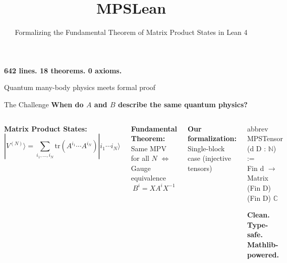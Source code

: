 \documentclass[aspectratio=169,10pt]{beamer}
\title{\textbf{MPSLean}}
\subtitle{Formalizing the Fundamental Theorem of Matrix Product States in Lean 4}
\date{}
\author{}
\begin{document}
\begin{frame}
\titlepage
\vspace{-2em}
\begin{center}
\huge\textcolor{leangreen}{\textbf{642 lines. 18 theorems. 0 axioms.}}

\vspace{1em}
\large Quantum many-body physics meets formal proof
\end{center}
\end{frame}

\begin{frame}{The Challenge}
\textbf{\LARGE When do $A$ and $B$ describe the same quantum physics?}

\vspace{0.5em}
\begin{columns}[T]
\textbf{Matrix Product States:}
\[
|V^{(N)}\rangle = \sum_{i_1,\ldots,i_N} \mathrm{tr}(A^{i_1}\cdots A^{i_N}) |i_1\cdots i_N\rangle
\]

\vspace{0.5em}
\textbf{\textcolor{leangreen}{Fundamental Theorem:}}\\
Same MPV for all $N$ $\Leftrightarrow$ Gauge equivalence
\[
B^i = X A^i X^{-1}
\]

\vspace{0.3em}
\textbf{Our formalization:} Single-block case (injective tensors)

\begin{center}

\vspace{1.5em}
{\ttfamily\small
abbrev MPSTensor (d D : $\mathbb{N}$) :=\\ 
\hspace*{0.5em}Fin d $\to$ Matrix (Fin D) (Fin D) $\mathbb{C}$
}

\vspace{0.5em}
\textbf{Clean. Type-safe. Mathlib-powered.}
\end{center}
\end{columns}
\end{frame}
\end{document}
